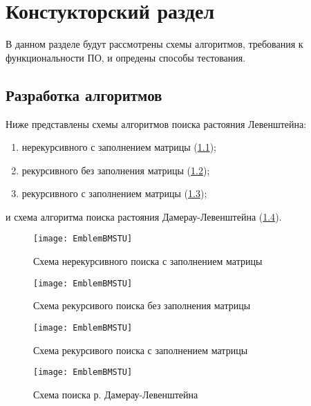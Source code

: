 \chapter{ Констукторский раздел}
\label{cha:design}
    В данном разделе будут рассмотрены схемы алгоритмов, требования к функциональности ПО,
    и опредены способы тестования.
    
    \section{Разработка алгоритмов}
        Ниже представлены схемы алгоритмов поиска растояния Левенштейна: \begin{enumerate}
            \item нерекурсивного с заполнением матрицы (\ref{schema:matr:Levenstein});
            \item рекурсивного без заполнения матрицы (\ref{schema:rec:Levenstein});
            \item рекурсивного с заполнением матрицы (\ref{schema:rec-matr:Levenstein});
        \end{enumerate}

        и схема алгоритма поиска растояния Дамерау-Левенштейна (\ref{schema:matr:Dameray-Levenstein}).

    \begin{figure}[h!]
        \centering
        \texttt{[image: EmblemBMSTU]}
        \caption{Схема нерекурсивного поиска с заполнением матрицы}
        \label{schema:matr:Levenstein}
    \end{figure}

    \begin{figure}[h!]
        \centering
        \texttt{[image: EmblemBMSTU]}
        \caption{Схема рекурсивого поиска без заполнения матрицы}
        \label{schema:rec:Levenstein}
    \end{figure}

    \begin{figure}[h!]
        \centering
        \texttt{[image: EmblemBMSTU]}
        \caption{Схема рекурсивого поиска с заполнением матрицы}
        \label{schema:rec-matr:Levenstein}
    \end{figure}

    \begin{figure}[h!]
        \centering
        \texttt{[image: EmblemBMSTU]}
        \caption{Схема поиска р. Дамерау-Левенштейна}
        \label{schema:matr:Dameray-Levenstein}
    \end{figure}

